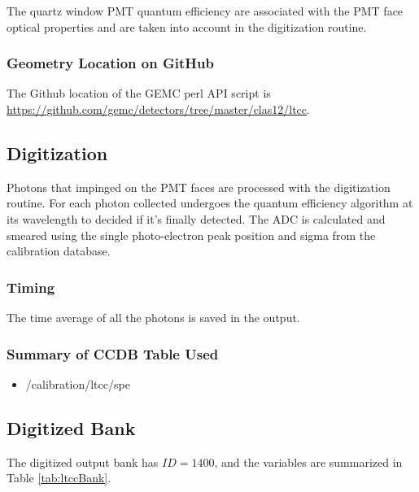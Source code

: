 The quartz window PMT quantum efficiency are associated with the PMT face optical properties and are taken into account in
the digitization routine.

\subsubsection{Geometry Location on GitHub}
The Github location of the GEMC perl API script is  \url{https://github.com/gemc/detectors/tree/master/clas12/ltcc}.


\subsection{Digitization}

Photons that impinged on the PMT faces are processed with the digitization routine.
For each photon collected undergoes the quantum efficiency algorithm at its wavelength to decided if it's finally detected.
The ADC is calculated and smeared using the single photo-electron peak position and sigma from the calibration database.


\subsubsection{Timing}

The time average of all the photons is saved in the output.

\subsubsection{Summary of CCDB Table Used}

\begin{itemize}
	\item /calibration/ltcc/spe
\end{itemize}

\subsection{Digitized Bank}

The digitized output bank has $ID=1400$, and the variables are summarized in Table \ref{tab:ltccBank}.

